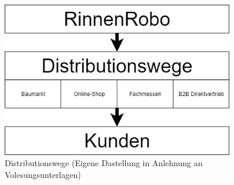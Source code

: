          \begin{figure}[ht]
            \centering
            \includegraphics[width = 0.9\textwidth]{Eigene Darstellungen/Distributionswege1.png}
    
            \caption{Distributionswege (Eigene Dastellung in Anlehnung an Volesungsunterlagen)}
         \end{figure}